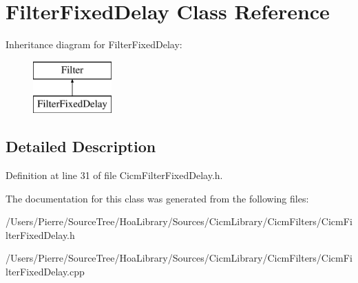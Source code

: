 \hypertarget{class_filter_fixed_delay}{\section{Filter\-Fixed\-Delay Class Reference}
\label{class_filter_fixed_delay}
}
Inheritance diagram for Filter\-Fixed\-Delay\-:\begin{figure}[H]
\begin{center}
\leavevmode
\includegraphics[height=2.000000cm]{class_filter_fixed_delay}
\end{center}
\end{figure}


\subsection{Detailed Description}


Definition at line 31 of file Cicm\-Filter\-Fixed\-Delay.\-h.



The documentation for this class was generated from the following files\-:\begin{DoxyCompactItemize}
\item 
/\-Users/\-Pierre/\-Source\-Tree/\-Hoa\-Library/\-Sources/\-Cicm\-Library/\-Cicm\-Filters/Cicm\-Filter\-Fixed\-Delay.\-h\item 
/\-Users/\-Pierre/\-Source\-Tree/\-Hoa\-Library/\-Sources/\-Cicm\-Library/\-Cicm\-Filters/Cicm\-Filter\-Fixed\-Delay.\-cpp\end{DoxyCompactItemize}
